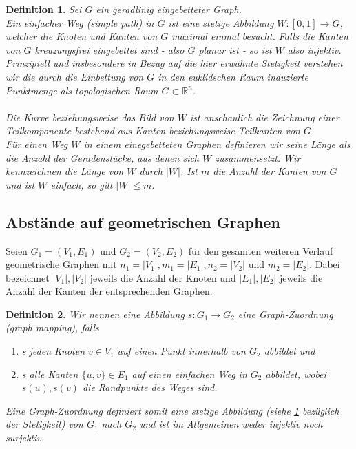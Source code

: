 \documentclass[a4paper, 12pt, twoside]{article}
\theoremstyle{Format1} %
\newtheorem{Def}{Definition}[section]       %
\begin{document}
\begin{Def} \label{Definition Einfacher Weg}
	Sei $G$ ein geradlinig eingebetteter Graph.
	\\
	Ein \textit{einfacher Weg (simple path) in $G$} ist eine stetige Abbildung $W: [0,1] \to G$, welcher die Knoten und Kanten von $G$ maximal einmal besucht.
	Falls die Kanten von $G$ kreuzungsfrei eingebettet sind - also $G$ planar ist - so ist $W$ also injektiv.
	Prinzipiell und insbesondere in Bezug auf die hier erwähnte \textit{Stetigkeit} verstehen wir die durch die Einbettung von
	$G$ in den euklidschen Raum induzierte Punktmenge als \textit{topologischen Raum} $G \subset \mathbb{R}^n$.
	\\
	\\
	Die Kurve beziehungsweise das Bild von $W$ ist anschaulich die Zeichnung einer Teilkomponente bestehend aus
	Kanten beziehungsweise Teilkanten von $G$.
	\\
	Für einen Weg $W$ in einem einegebetteten Graphen definieren wir seine \textit{Länge} als die Anzahl der Geradenstücke, aus
	denen sich $W$ zusammensetzt. Wir kennzeichnen die Länge von $W$ durch $|W|$. Ist $m$ die Anzahl der Kanten von $G$ und ist $W$ einfach, so gilt
	$|W| \leq m$.
\end{Def}

\subsection{Abstände auf geometrischen Graphen}

Seien $ G_1=(V_1, E_1) $ und $ G_2=(V_2, E_2) $ für den gesamten weiteren Verlauf geometrische Graphen mit
$n_1 = |V_1|, m_1 = |E_1|, n_2 = |V_2|$ und $m_2 = |E_2|$. Dabei bezeichnet $|V_1|, |V_2|$ jeweils die Anzahl der Knoten und $|E_1|,|E_2|$ jeweils die Anzahl der Kanten
der entsprechenden Graphen.

\begin{Def} \label{Definition Graph-Zuordnung}
	Wir nennen eine Abbildung $s: G_1 \to G_2 $ eine \textit{Graph-Zuordnung (graph mapping)}, falls
    	\begin{enumerate}
		\item[1)] s jeden Knoten $ v \in V_1 $ auf einen Punkt innerhalb von $ G_2 $ abbildet und
		\item[2)] s alle Kanten $ \{u,v\} \in E_1 $ auf einen einfachen Weg in $G_2$ abbildet, wobei $s(u), s(v)$ die Randpunkte des Weges sind.
    	\end{enumerate}

	Eine Graph-Zuordnung definiert somit eine stetige Abbildung (siehe \ref{Definition Einfacher Weg} bezüglich der Stetigkeit) von $ G_1 $ nach $ G_2 $ und ist im Allgemeinen weder injektiv noch surjektiv.
\end{Def}
\end{document}
